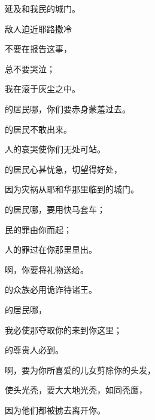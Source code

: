 {\par }{\Q 延及{}和{}我民的城门。
\par }{\SH 敌人迫近耶路撒冷
\par }{\Q {}不要在{}报告这事，
\par }{\Q 总不要哭泣；
\par }{\Q 我在{}滚于灰尘之中。
\par }{\Q {}的居民哪，你们要赤身蒙羞过去。
\par }{的居民不敢出来。
\par }{人的哀哭使你们无处可站。
\par }{\Q {}的居民心甚忧急，切望得好处，
\par }{\Q 因为灾祸从耶和华那里临到{}的城门。
\par }{\Q {}的居民哪，要用快马套车；
\par }{民的罪由你而起；
\par }{人的罪过在你那里显出。
\par }{\Q {}啊，你要将礼物送给{}。
\par }{的众族必用诡诈待{}诸王。
\par }{\Q {}的居民哪，
\par }{\Q 我必使那夺取你的来到你这里；
\par }{的尊贵人必到{}。
\par }{\Q {}啊，要为你所喜爱的儿女剪除你的头发，
\par }{\Q 使头光秃，要大大地光秃，如同秃鹰，
\par }{\Q 因为他们都被掳去离开你。

}
